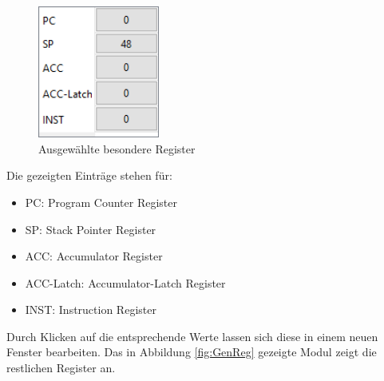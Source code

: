 \documentclass[12pt]{article}
\newcommand{\imgSpaceBefore}{\vspace{10pt}}
\begin{document}
\begin{figure}[h]
\centering
\includegraphics[width=4cm]{bilder/Register}
\caption{Ausgewählte besondere Register}
\label{fig:Register}
\end{figure}

\noindent
Die gezeigten Einträge stehen für:\imgSpaceBefore

\begin{itemize}
	\item PC: Program Counter Register
	\item SP: Stack Pointer Register
	\item ACC: Accumulator Register
	\item ACC-Latch: Accumulator-Latch Register
	\item INST: Instruction Register
\end{itemize}

\noindent
Durch Klicken auf die entsprechende Werte lassen sich diese in einem neuen Fenster bearbeiten.
Das in Abbildung \ref{fig:GenReg} gezeigte Modul zeigt die restlichen Register an.\imgSpaceBefore
\end{document}
